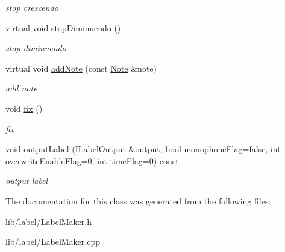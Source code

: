 \begin{DoxyCompactItemize}
\begin{DoxyCompactList}\small\item\em stop crescendo \end{DoxyCompactList}\item 
\hypertarget{classsinsy_1_1LabelMaker_abd05f88c778af183152fb451ffdb3ead}{virtual void \hyperlink{classsinsy_1_1LabelMaker_abd05f88c778af183152fb451ffdb3ead}{stop\-Diminuendo} ()}\label{classsinsy_1_1LabelMaker_abd05f88c778af183152fb451ffdb3ead}

\begin{DoxyCompactList}\small\item\em stop diminuendo \end{DoxyCompactList}\item 
\hypertarget{classsinsy_1_1LabelMaker_a10e05c4a3659934bab28afa9da526485}{virtual void \hyperlink{classsinsy_1_1LabelMaker_a10e05c4a3659934bab28afa9da526485}{add\-Note} (const \hyperlink{classsinsy_1_1Note}{\-Note} \&note)}\label{classsinsy_1_1LabelMaker_a10e05c4a3659934bab28afa9da526485}

\begin{DoxyCompactList}\small\item\em add note \end{DoxyCompactList}\item 
\hypertarget{classsinsy_1_1LabelMaker_a4693a701ba327d990576ed695476b2d9}{void \hyperlink{classsinsy_1_1LabelMaker_a4693a701ba327d990576ed695476b2d9}{fix} ()}\label{classsinsy_1_1LabelMaker_a4693a701ba327d990576ed695476b2d9}

\begin{DoxyCompactList}\small\item\em fix \end{DoxyCompactList}\item 
\hypertarget{classsinsy_1_1LabelMaker_a417030b25b59f3d6404c4a6dbe91a76b}{void \hyperlink{classsinsy_1_1LabelMaker_a417030b25b59f3d6404c4a6dbe91a76b}{output\-Label} (\hyperlink{classsinsy_1_1ILabelOutput}{\-I\-Label\-Output} \&output, bool monophone\-Flag=false, int overwrite\-Enable\-Flag=0, int time\-Flag=0) const }\label{classsinsy_1_1LabelMaker_a417030b25b59f3d6404c4a6dbe91a76b}

\begin{DoxyCompactList}\small\item\em output label \end{DoxyCompactList}\end{DoxyCompactItemize}


\-The documentation for this class was generated from the following files\-:\begin{DoxyCompactItemize}
\item 
lib/label/\-Label\-Maker.\-h\item 
lib/label/\-Label\-Maker.\-cpp\end{DoxyCompactItemize}
